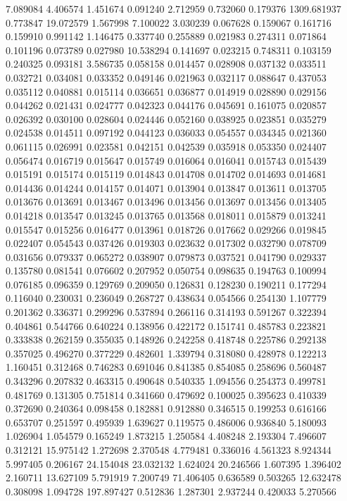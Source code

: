7.089084
4.406574
1.451674
0.091240
2.712959
0.732060
0.179376
1309.681937
0.773847
19.072579
1.567998
7.100022
3.030239
0.067628
0.159067
0.161716
0.159910
0.991142
1.146475
0.337740
0.255889
0.021983
0.274311
0.071864
0.101196
0.073789
0.027980
10.538294
0.141697
0.023215
0.748311
0.103159
0.240325
0.093181
3.586735
0.058158
0.014457
0.028908
0.037132
0.033511
0.032721
0.034081
0.033352
0.049146
0.021963
0.032117
0.088647
0.437053
0.035112
0.040881
0.015114
0.036651
0.036877
0.014919
0.028890
0.029156
0.044262
0.021431
0.024777
0.042323
0.044176
0.045691
0.161075
0.020857
0.026392
0.030100
0.028604
0.024446
0.052160
0.038925
0.023851
0.035279
0.024538
0.014511
0.097192
0.044123
0.036033
0.054557
0.034345
0.021360
0.061115
0.026991
0.023581
0.042151
0.042539
0.035918
0.053350
0.024407
0.056474
0.016719
0.015647
0.015749
0.016064
0.016041
0.015743
0.015439
0.015191
0.015174
0.015119
0.014843
0.014708
0.014702
0.014693
0.014681
0.014436
0.014244
0.014157
0.014071
0.013904
0.013847
0.013611
0.013705
0.013676
0.013691
0.013467
0.013496
0.013456
0.013697
0.013456
0.013405
0.014218
0.013547
0.013245
0.013765
0.013568
0.018011
0.015879
0.013241
0.015547
0.015256
0.016477
0.013961
0.018726
0.017662
0.029266
0.019845
0.022407
0.054543
0.037426
0.019303
0.023632
0.017302
0.032790
0.078709
0.031656
0.079337
0.065272
0.038907
0.079873
0.037521
0.041790
0.029337
0.135780
0.081541
0.076602
0.207952
0.050754
0.098635
0.194763
0.100994
0.076185
0.096359
0.129769
0.209050
0.126831
0.128230
0.190211
0.177294
0.116040
0.230031
0.236049
0.268727
0.438634
0.054566
0.254130
1.107779
0.201362
0.336371
0.299296
0.537894
0.266116
0.314193
0.591267
0.322394
0.404861
0.544766
0.640224
0.138956
0.422172
0.151741
0.485783
0.223821
0.333838
0.262159
0.355035
0.148926
0.242258
0.418748
0.225786
0.292138
0.357025
0.496270
0.377229
0.482601
1.339794
0.318080
0.428978
0.122213
1.160451
0.312468
0.746283
0.691046
0.841385
0.854085
0.258696
0.560487
0.343296
0.207832
0.463315
0.490648
0.540335
1.094556
0.254373
0.499781
0.481769
0.131305
0.751814
0.341660
0.479692
0.100025
0.395623
0.410339
0.372690
0.240364
0.098458
0.182881
0.912880
0.346515
0.199253
0.616166
0.653707
0.251597
0.495939
1.639627
0.119575
0.486006
0.936840
5.180093
1.026904
1.054579
0.165249
1.873215
1.250584
4.408248
2.193304
7.496607
0.312121
15.975142
1.272698
2.370548
4.779481
0.336016
4.561323
8.924344
5.997405
0.206167
24.154048
23.032132
1.624024
20.246566
1.607395
1.396402
2.160711
13.627109
5.791919
7.200749
71.406405
0.636589
0.503265
12.632478
0.308098
1.094728
197.897427
0.512836
1.287301
2.937244
0.420033
5.270566
